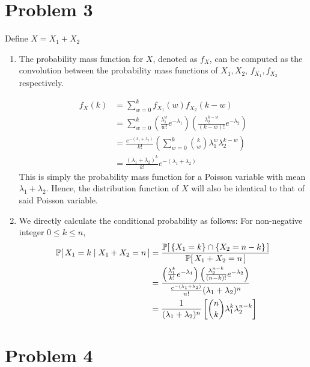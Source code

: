 \documentclass[12pt]{article}%
\begin{document}
\section{Problem 3}
Define $X = X_1 + X_2$
%
\begin{enumerate}
  \item The probability mass function for $X$, denoted as $f_X$, can be computed as the convolution between the probability mass functions of $X_1,X_2$, $f_{X_1}, f_{X_2}$ respectively.

  \begin{align*}
    f_X(k) & = \sum_{w = 0}^k f_{X_1}(w)f_{X_2}(k-w) \\
    & = \sum_{w = 0}^k \left(\frac{\lambda_1^w}{w!}e^{-\lambda_1}\right)\left(\frac{\lambda_2^{k - w}}{(k-w)!}e^{-\lambda_2}\right) \\
    & = \frac{e^{-(\lambda_1 + \lambda_2)}}{k!}\left(\sum_{w =0}^k {k \choose w} \lambda_1^w \lambda_2^{k-w}\right) \\
    & = \frac{(\lambda_1 + \lambda_2)^k}{k!} e^{-(\lambda_1 + \lambda_2)}
  \end{align*}
%
This is simply the probability mass function for a Poisson variable with mean $\lambda_1 + \lambda_2$. Hence, the distribution function of $X$ will also be identical to that of said Poisson variable.

\item
We directly calculate the conditional probability as follows: For non-negative integer $0 \leq k \leq n$,
\begin{align*}
  \mathbb{P}[\,X_1 = k \mid X_1 + X_2 = n\,]&  = \frac{\mathbb{P}[\,\{X_1 = k\} \cap \{X_2 = n - k\}\,]}{\mathbb{P}[\,X_1 + X_2 = n\,]} \\
  & = \frac{\left(\frac{\lambda_1^k}{k!}e^{-\lambda_1}\right)\left(\frac{\lambda_2^{n-k}}{(n-k)!} e^{-\lambda_2}\right)}{\frac{e^{-(\lambda_1 + \lambda_2)}}{n!}(\lambda_1 + \lambda_2)^n} \\
  & = \frac{1}{(\lambda_1 + \lambda_2)^n} \left[{n \choose k} \lambda_1^k \lambda_2^{n-k}\right]
\end{align*}
\end{enumerate}


\section{Problem 4}
\end{document}
